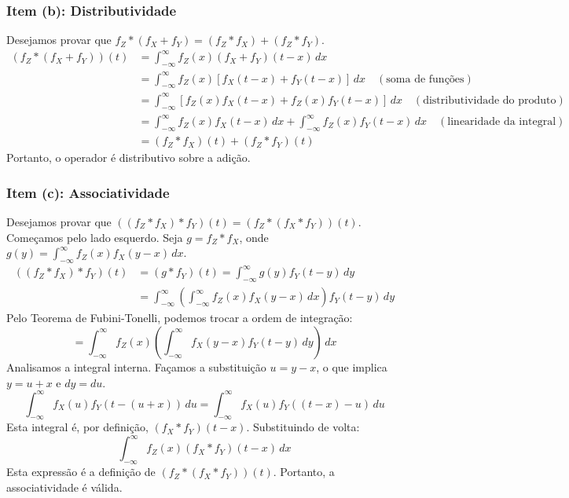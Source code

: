 \documentclass[
]{article}
\begin{document}
\subsubsection*{Item (b): Distributividade}

Desejamos provar que \(f_Z * (f_X + f_Y) = (f_Z * f_X) + (f_Z * f_Y)\).
\begin{align*}
    (f_Z * (f_X+f_Y))(t) &= \int_{-\infty}^{\infty} f_Z(x) (f_X+f_Y)(t-x) \,dx \\
    &= \int_{-\infty}^{\infty} f_Z(x) [f_X(t-x) + f_Y(t-x)] \,dx \quad (\text{soma de funções}) \\
    &= \int_{-\infty}^{\infty} [f_Z(x)f_X(t-x) + f_Z(x)f_Y(t-x)] \,dx \quad (\text{distributividade do produto}) \\
    &= \int_{-\infty}^{\infty} f_Z(x)f_X(t-x) \,dx + \int_{-\infty}^{\infty} f_Z(x)f_Y(t-x) \,dx \quad (\text{linearidade da integral}) \\
    &= (f_Z * f_X)(t) + (f_Z * f_Y)(t)
\end{align*} Portanto, o operador é distributivo sobre a adição.

\subsubsection*{Item (c): Associatividade}

Desejamos provar que
\(((f_Z * f_X) * f_Y)(t) = (f_Z * (f_X * f_Y))(t)\). Começamos pelo lado
esquerdo. Seja \(g = f_Z * f_X\), onde
\(g(y) = \int_{-\infty}^{\infty} f_Z(x) f_X(y-x) \,dx\). \begin{align*}
    ((f_Z * f_X) * f_Y)(t) &= (g * f_Y)(t) = \int_{-\infty}^{\infty} g(y) f_Y(t-y) \,dy \\
    &= \int_{-\infty}^{\infty} \left( \int_{-\infty}^{\infty} f_Z(x) f_X(y-x) \,dx \right) f_Y(t-y) \,dy
\end{align*} Pelo Teorema de Fubini-Tonelli, podemos trocar a ordem de
integração:
\[ = \int_{-\infty}^{\infty} f_Z(x) \left( \int_{-\infty}^{\infty} f_X(y-x) f_Y(t-y) \,dy \right) \,dx \]
Analisamos a integral interna. Façamos a substituição \(u = y-x\), o que
implica \(y = u+x\) e \(dy = du\).
\[ \int_{-\infty}^{\infty} f_X(u) f_Y(t-(u+x)) \,du = \int_{-\infty}^{\infty} f_X(u) f_Y((t-x)-u) \,du \]
Esta integral é, por definição, \((f_X * f_Y)(t-x)\). Substituindo de
volta: \[ \int_{-\infty}^{\infty} f_Z(x) (f_X * f_Y)(t-x) \,dx \] Esta
expressão é a definição de \((f_Z * (f_X * f_Y))(t)\). Portanto, a
associatividade é válida.
\end{document}
